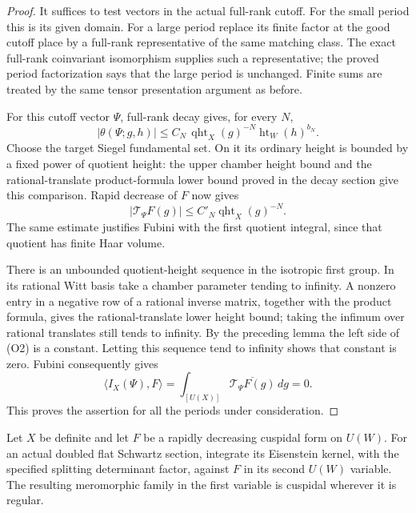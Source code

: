 \begin{proof}
It suffices to test vectors in the actual full-rank cutoff.
For the small period this is its given domain.
For a large period replace its finite factor at the good cutoff
place by a full-rank representative of the same matching class.
The exact full-rank coinvariant isomorphism supplies such a
representative; the proved period factorization says that
the large period is unchanged. Finite sums are treated by
the same tensor presentation argument as before.

For this cutoff vector \(\Psi\), full-rank decay gives, for every
\(N\),
\[
 |\theta(\Psi;g,h)|
       \le C_N\,\operatorname{qht}_X(g)^{-N}
                         \operatorname{ht}_W(h)^{b_N}.
\]
Choose the target Siegel fundamental set. On it its ordinary
height is bounded by a fixed power of quotient height:
the upper chamber height bound and the rational-translate
product-formula lower bound proved in the decay section give
this comparison. Rapid decrease of \(F\) now gives
\[
 |\mathcal T_\Psi F(g)|
       \le C'_N\operatorname{qht}_X(g)^{-N}.
 \tag{O2}\label{eq:sr-theta-backlift-decay}
\]
The same estimate justifies Fubini with the first quotient
integral, since that quotient has finite Haar volume.

There is an unbounded quotient-height sequence in the isotropic
first group. In its rational Witt basis take a chamber parameter
tending to infinity. A nonzero entry in a negative row of a
rational inverse matrix, together with the product formula,
gives the rational-translate lower height bound; taking the
infimum over rational translates still tends to infinity.
By the preceding lemma the left side of (O2) is a constant.
Letting this sequence tend to infinity shows that constant is zero.
Fubini consequently gives
\[
 \langle I_X(\Psi),F\rangle
        =\int_{[U(X)]}\overline{\mathcal T_\Psi F(g)}\,dg=0.
\]
This proves the assertion for all the periods under consideration.
\end{proof}

\begin{srlemma}
\label{lem:sr-theta-cuspidal-doubling-pullback}
Let \(X\) be definite and let \(F\) be a rapidly decreasing
cuspidal form on \(U(W)\).
For an actual doubled flat Schwartz section, integrate its
Eisenstein kernel, with the specified splitting determinant
factor, against \(F\) in its second \(U(W)\) variable.
The resulting meromorphic family in the first variable is
cuspidal wherever it is regular.
\end{srlemma}

